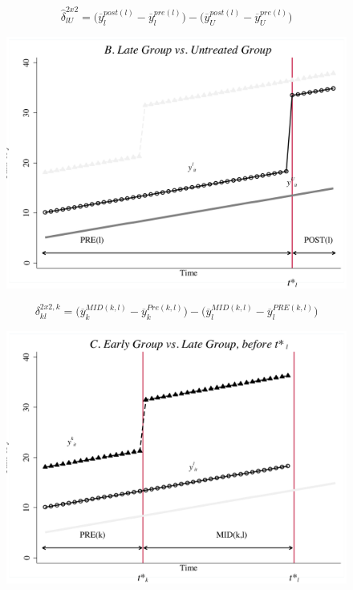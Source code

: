 \documentclass{beamer}
\begin{document}
\begin{frame}[plain]
$$\widehat{\delta}^{2x2}_{lU} = \bigg ( \overline{y}_l^{post(l)} - \overline{y}_l^{pre(l)} \bigg ) - \bigg ( \overline{y}_U^{post(l)} - \overline{y}_U^{pre(l)} \bigg ) $$
	\begin{figure}
	\includegraphics[scale=0.5]{./lecture_includes/bacon_goodman_4.png}
	\end{figure}

\end{frame}


\begin{frame}[plain]

$$\delta_{kl}^{2x2,k} = \bigg ( \overline{y}_k^{MID(k,l)} - \overline{y}_k^{Pre(k,l)} \bigg ) - \bigg ( \overline{y}_l^{MID(k,l)} - \overline{y}_l^{PRE(k,l)} \bigg ) $$

	\begin{figure}
	\includegraphics[scale=0.5]{./lecture_includes/bacon_goodman_6.png}
	\end{figure}

\end{frame}
\end{document}
